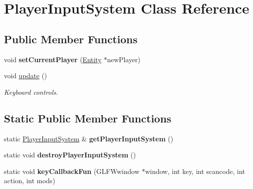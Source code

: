 \hypertarget{class_player_input_system}{}\section{Player\+Input\+System Class Reference}
\label{class_player_input_system}
\subsection*{Public Member Functions}
\begin{DoxyCompactItemize}
\item 
\hypertarget{class_player_input_system_aa3f47a4273ece19097dca4a1e43cd952}{}void {\bfseries set\+Current\+Player} (\hyperlink{class_entity}{Entity} $\ast$new\+Player)\label{class_player_input_system_aa3f47a4273ece19097dca4a1e43cd952}

\item 
void \hyperlink{class_player_input_system_afba45156bbafbfd5500650d33ef589ca}{update} ()
\begin{DoxyCompactList}\small\item\em Keyboard controls. \end{DoxyCompactList}\end{DoxyCompactItemize}
\subsection*{Static Public Member Functions}
\begin{DoxyCompactItemize}
\item 
\hypertarget{class_player_input_system_af1bb16d56fb4435a92bfff2158a1724c}{}static \hyperlink{class_player_input_system}{Player\+Input\+System} \& {\bfseries get\+Player\+Input\+System} ()\label{class_player_input_system_af1bb16d56fb4435a92bfff2158a1724c}

\item 
\hypertarget{class_player_input_system_a4cebc3aabd6d71e05a51d319d83f9fc7}{}static void {\bfseries destroy\+Player\+Input\+System} ()\label{class_player_input_system_a4cebc3aabd6d71e05a51d319d83f9fc7}

\item 
\hypertarget{class_player_input_system_aaf1f183eaecedec4fca9494f54c3d026}{}static void {\bfseries key\+Callback\+Fun} (G\+L\+F\+Wwindow $\ast$window, int key, int scancode, int action, int mods)\label{class_player_input_system_aaf1f183eaecedec4fca9494f54c3d026}

\end{DoxyCompactItemize}


